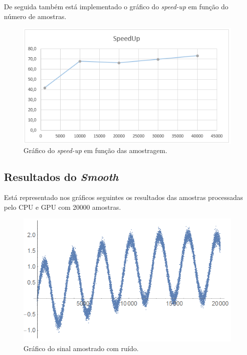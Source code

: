 \documentclass[11pt]{article}
\numberwithin{equation}{section}
\begin{document}
 De seguida também está implementado o gráfico do \textit{speed-up} em função do número de amostras.
 \begin{figure}[H]
 	\centering
 	\includegraphics[keepaspectratio=true, scale=0.6]{graficodospeedup2}
 	\vspace{-0.5em}
 	\caption{Gráfico do \textit{speed-up} em função das amostragem.}
 	\vspace{-0.8em}
 	\label{fig:imag of i}
 \end{figure} 
 

\subsection{Resultados do \textit{Smooth}}
Está representado nos gráficos seguintes os resultados das amostras processadas pelo CPU e GPU com 20000 amostras.
\begin{figure}[H]
	\centering
	\includegraphics[keepaspectratio=true, scale=0.6]{print2}
	\vspace{-0.5em}
	\caption{Gráfico do sinal amostrado com ruído.}
	\vspace{-0.8em}
	\label{fig:imag of i}
\end{figure} 
\end{document}
